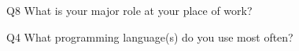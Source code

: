 \begin{description}%
\item{Q8} What is your major role at your place of work?%
\item{Q4} What programming language(s) do you use most often?%
\end{description}%

